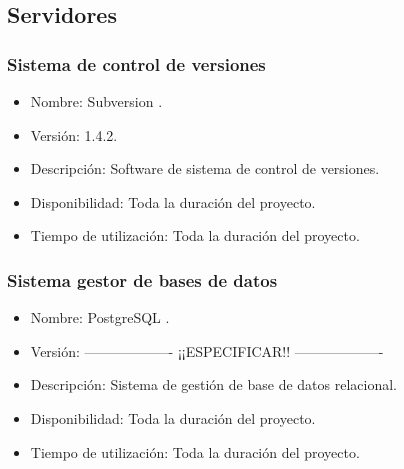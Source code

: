    \subsection{Servidores}

      \subsubsection{Sistema de control de versiones}

         \begin{itemize}
            \item Nombre: Subversion \cite{subversion}.
            \item Versión: 1.4.2.
            \item Descripción: Software de sistema de control de versiones.
            \item Disponibilidad: Toda la duración del proyecto.
            \item Tiempo de utilización: Toda la duración del proyecto.
         \end{itemize}

      \subsubsection{Sistema gestor de bases de datos}

         \begin{itemize}
          \item Nombre: PostgreSQL \cite{postgresql}.
          \item Versión: ------------------- ¡¡ESPECIFICAR!! -------------------
          \item Descripción: Sistema de gestión de base de datos relacional.
          \item Disponibilidad: Toda la duración del proyecto.
          \item Tiempo de utilización: Toda la duración del proyecto.
         \end{itemize}
